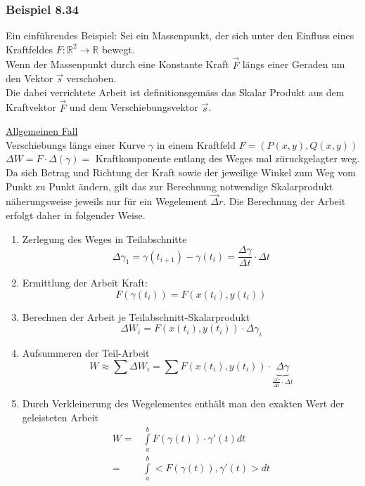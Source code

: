 \subsubsection*{Beispiel 8.34}
Ein einführendes Beispiel: Sei ein Massenpunkt, der sich unter den Einfluss eines Kraftfeldes $F:\mathbb{R}^2\rightarrow\mathbb{R}$ bewegt.\\

Wenn der Massenpunkt durch eine Konstante Kraft $\overrightarrow F $ längs einer Geraden um den Vektor $\vec s$ verschoben. \\

Die dabei verrichtete Arbeit ist definitionsgemäss das Skalar Produkt aus dem Kraftvektor $\overrightarrow F $ und dem Verschiebungsvektor $\vec s$.

\noindent\underline{Allgemeinen Fall}\\
Verschiebungs längs einer Kurve $\gamma$ in einem Kraftfeld $F=\left( P(x,y),Q(x,y)\right)$ 
$\Delta W= F\cdot \Delta (\gamma)=$ Kraftkomponente entlang des Weges mal züruckgelagter weg. \\

Da sich Betrag und Richtung der Kraft sowie der jeweilige Winkel zum Weg vom Punkt zu Punkt ändern, gilt das zur Berechnung notwendige Skalarprodukt näherungsweise jeweils nur für ein Wegelement $\overrightarrow\Delta r$. Die Berechnung der Arbeit erfolgt daher in folgender Weise. 
\begin{enumerate}[\indent a)]
\item Zerlegung des Weges in Teilabschnitte $$\Delta \gamma_1=\gamma (t_{i+1})-\gamma(t_i)=\frac{\Delta \gamma}{\Delta t}\cdot \Delta t$$
\item Ermittlung der Arbeit  Kraft: \[F\left( {\gamma \left( {{t_i}} \right)} \right) = F\left( {x\left( {{t_i}} \right),y\left( {{t_i}} \right)} \right)\]
\item Berechnen der Arbeit je Teilabschnitt-Skalarprodukt \[\Delta {W_i} = F\left( {x\left( {{t_i}} \right),y\left( {{t_i}} \right)} \right) \cdot \Delta {\gamma _i}\]
\item Aufsummeren der Teil-Arbeit \[W \approx \sum {\Delta {W_i} = \sum {F\left( {x\left( {{t_i}} \right),y\left( {{t_i}} \right)} \right)} }  \cdot \underbrace {\Delta \gamma }_{\frac{{\Delta \gamma }}{{\Delta t}} \cdot \Delta t}\]
\item Durch Verkleinerung des Wegelementes enthält man den exakten Wert der geleisteten Arbeit
\begin{align*}
W = &\int\limits_a^b {F\left( {\gamma \left( t \right)} \right)}  \cdot \gamma '\left( t \right)dt\\
 = &\int\limits_a^b { < F\left( {\gamma \left( t \right)} \right)} ,\gamma '\left( t \right) > dt
\end{align*}
\end{enumerate} 
